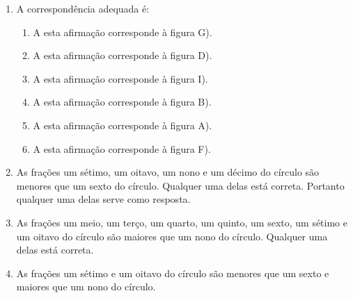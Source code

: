 \documentclass[10 pt,usenames,dvipsnames, oneside]{article}
\begin{document}
\begin{solucao}

\begin{enumerate}[label=\alph*),wide,labelindent=0pt] %
    \item       A correspondência adequada é:
\begin{enumerate} [label=\Roman*), labelindent=0pt] %
        \item           A esta afirmação corresponde à figura G).
        \item           A esta afirmação corresponde à figura D).
        \item           A esta afirmação corresponde à figura I).
        \item           A esta afirmação corresponde à figura B).
        \item           A esta afirmação corresponde à figura A).
        \item           A esta afirmação corresponde à figura F).
\end{enumerate} %

    \item       As frações um sétimo, um oitavo, um nono e um décimo do círculo são menores que um sexto do círculo. Qualquer uma delas está correta. Portanto qualquer uma delas serve como resposta.
    \item       As frações um meio, um terço, um quarto, um quinto, um sexto, um sétimo e um oitavo do círculo são maiores que um nono do círculo. Qualquer uma delas está correta.
    \item       As frações um sétimo e um oitavo do círculo são menores que um sexto e maiores que um nono do círculo.
\end{enumerate} %

\end{solucao}
\fi
\end{document}

